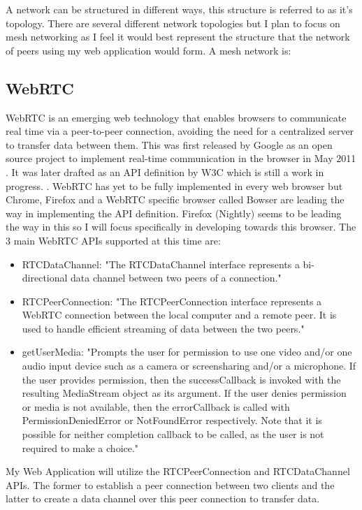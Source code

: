 \documentclass[]{report}
\begin{document}
			A network can be structured in different ways, this structure is referred to as it's topology. There are several different network topologies but I plan to focus on mesh networking as I feel it would best represent the structure that the network of peers using my web application would form. A mesh network is: 
		
		\subsection*{}
		\subsection*{WebRTC}
			WebRTC is an emerging web technology that enables browsers to communicate real time via a peer-to-peer connection, avoiding the need for a centralized server to transfer data between them. This was first released by Google as an open source project to implement real-time communication in the browser in May 2011 \cite{Google WebRTC Release}. It was later drafted as an API definition by W3C which is still a work in progress. \cite{W3C WebRTC Definition}. WebRTC has yet to be fully implemented in every web browser but Chrome, Firefox and a WebRTC specific browser called Bowser are leading the way in implementing the API definition. Firefox (Nightly) seems to be leading the way in this so I will focus specifically in developing towards this browser\cite{WebRTC browser support}.
			The 3 main WebRTC APIs supported at this time are:
				\begin{itemize}
					\item RTCDataChannel:
					"The RTCDataChannel interface represents a bi-directional data channel between two peers of a connection." \cite{Mozilla Web API}
					\item RTCPeerConnection:
					"The RTCPeerConnection interface represents a WebRTC connection between the local computer and a remote peer. It is used to handle efficient streaming of data between the two peers." 
					\cite{Mozilla Web API}
					\item getUserMedia:
					"Prompts the user for permission to use one video and/or one audio input device such as a camera or screensharing and/or a microphone. If the user provides permission, then the successCallback is invoked with the resulting MediaStream object as its argument. If the user denies permission or media is not available, then the errorCallback is called with PermissionDeniedError or NotFoundError respectively. Note that it is possible for neither completion callback to be called, as the user is not required to make a choice."
					\cite{Mozilla Web API}
				\end{itemize}
			My Web Application will utilize the RTCPeerConnection and RTCDataChannel APIs. The former to establish a peer connection between two clients and the latter to create a data channel over this peer connection to transfer data.
			
\end{document}
